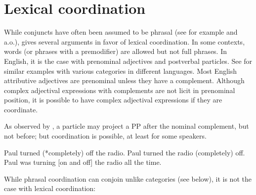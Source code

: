 \documentclass[output=paper
                ,modfonts
                ,nonflat
	        ,collection
	        ,collectionchapter
	        ,collectiontoclongg
 	        ,biblatex
                ,babelshorthands
                ,newtxmath
                ,draftmode
                ,colorlinks, citecolor=brown
]{./langsci/langscibook}
\begin{document}
\section{Lexical coordination}\label{lexcoord}


While conjuncts have often been assumed to be phrasal (see for example \citet{Kayne:94} and \citet{bruening} a.o.), \citet{Abeille:06} gives several arguments in favor of lexical coordination.
In some contexts, words (or phrases with a premodifier) are allowed but not full phrases. In English, it is the case with prenominal adjectives and postverbal particles. See \citet{Abeille:06} for similar examples with various categories in different languages. Most English attributive adjectives are prenominal unless they have a complement. Although complex adjectival expressions with complements are not licit in prenominal position,  it is possible to have complex adjectival expressions if they are coordinate.

\begin{exe}
 \ex
\begin{xlista}
\end{xlista}
\end{exe}

As observed by \citet{hpsg1}, a particle may project a  PP  after the nominal complement, but not before; but coordination is possible, at least for some speakers.

\begin{exe}
 \ex
\begin{xlista}
\ex Paul turned (*completely) off the radio.
\ex Paul turned the radio (completely) off.
\ex Paul was turning [on and off] the radio all the time.
\end{xlista}
\end{exe}

While phrasal coordination can conjoin unlike categories (see below), it is not the case with lexical coordination:

\begin{exe}
 \ex
\begin{xlista}
\end{xlista}
\end{exe}
\end{document}
